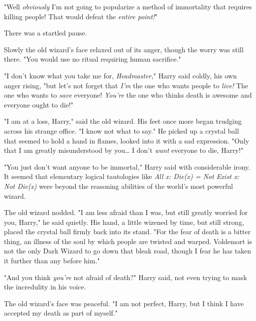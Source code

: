 "Well \emph{obviously} I'm not going to popularize a method of immortality that
requires killing people! That would defeat the \emph{entire point!}"

There was a startled pause.

Slowly the old wizard's face relaxed out of its anger, though the worry was
still there. "You would use no ritual requiring human sacrifice."

"I don't know what you take me for, \emph{Headmaster,}" Harry said coldly, his
own anger rising, "but let's not forget that \emph{I'm} the one who wants
people to \emph{live!} The one who wants to \emph{save} everyone! \emph{You're}
the one who thinks death is awesome and everyone ought to die!"

"I am at a loss, Harry," said the old wizard. His feet once more began trudging
across his strange office. "I know not what to say." He picked up a crystal
ball that seemed to hold a hand in flames, looked into it with a sad
expression. "Only that I am greatly misunderstood by you{\ldots} I don't
\emph{want} everyone to die, Harry!"

"You just don't want anyone to be immortal," Harry said with considerable
irony. It seemed that elementary logical tautologies like \emph{All x: Die(x) =
Not Exist x: Not Die(x)} were beyond the reasoning abilities of the world's
most powerful wizard.

The old wizard nodded. "I am less afraid than I was, but still greatly worried
for you, Harry," he said quietly. His hand, a little wizened by time, but still
strong, placed the crystal ball firmly back into its stand. "For the fear of
death is a bitter thing, an illness of the soul by which people are twisted and
warped. Voldemort is not the only Dark Wizard to go down that bleak road,
though I fear he has taken it further than any before him."

"And you think \emph{you're} not afraid of death?" Harry said, not even trying
to mask the incredulity in his voice.

The old wizard's face was peaceful. "I am not perfect, Harry, but I think I
have accepted my death as part of myself."

